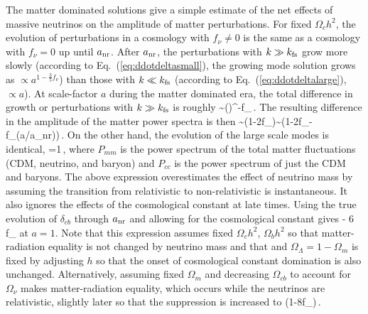 The matter dominated solutions give a simple estimate of the net effects of massive neutrinos on the amplitude of matter perturbations. For fixed $\Omega_c h^2$, the evolution of perturbations in a cosmology with $f_\nu \neq 0$ is the same as a cosmology with $f_\nu =0$ up until $a_{\rm nr}$. After $a_{\rm nr}$, the perturbations with $k\gg k_{\rm fs}$ grow more slowly (according to Eq.~(\ref{eq:ddotdeltasmall}), the growing mode solution grows as  $\propto a^{1-\frac{3}{5}f_\nu}$) than those with $k\ll k_{\rm fs}$ (according to Eq.~(\ref{eq:ddotdeltalarge}), $\propto a$).  At scale-factor $a$ during the matter dominated era, the total difference in growth or perturbations with $k\gg k_{\rm fs}$ is roughly
\beq
{} \sim \left(\right)^{-f_\nu}\,.
\eeq
The resulting difference in the amplitude of the matter power spectra is then 
\beq
{}\sim (1-2f_\nu)\sim \left(1-2f_\nu -f_\nu\ln\left(a/a_{\rm nr}\right)\right)\,.
\eeq
On the other hand, the evolution of the large scale modes is identical,
\beq
{}=1\,,
\eeq
where $P_{mm}$ is the power spectrum of the total matter fluctuations (CDM, neutrino, and baryon) and $P_{cc}$ is the power spectrum of just the CDM and baryons.  The above expression overestimates the effect of neutrino mass by assuming the transition from relativistic to non-relativistic is instantaneous. It also ignores the effects of the cosmological constant at late times. Using the true evolution of $\delta_{cb}$ through $a_{\rm nr}$ and allowing for the cosmological constant gives 
\beq
{} - 6 f_\nu
\eeq
at $a=1$. Note that this expression assumes fixed $\Omega_ch^2$, $\Omega_bh^2$ so that matter-radiation equality is not changed by neutrino mass and that and $\Omega_\Lambda = 1-\Omega_m$ is fixed by adjusting $h$ so that the onset of cosmological constant domination is also unchanged. Alternatively, assuming fixed $\Omega_m$ and decreasing $\Omega_{cb}$ to account for $\Omega_\nu$ makes matter-radiation equality, which occurs while the neutrinos are relativistic, slightly later so that the suppression is increased to
\beq
{} \approx (1-8f_\nu)\,.
\eeq

